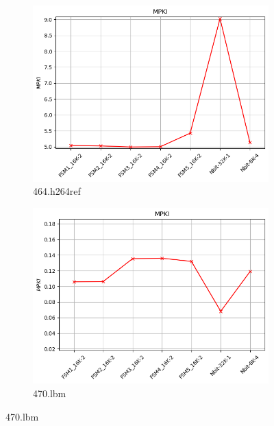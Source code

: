 \documentclass{article}
\begin{document}
\begin{figure}
    \vspace{0.5cm} %

    \begin{subfigure}[b]{0.45\textwidth}
        \includegraphics[width=\textwidth]{figures/5_3_c/464.h264ref.cslab_branch_preds_ref.out.png}
        \caption{464.h264ref}
        \label{fig:plot45}
    \end{subfigure}
    \hfill
    \begin{subfigure}[b]{0.45\textwidth}
        \includegraphics[width=\textwidth]{figures/5_3_c/470.lbm.cslab_branch_preds_ref.out.png}
        \caption{470.lbm}
        \label{fig:plot46}
    \end{subfigure}


\end{figure}
\end{document}

